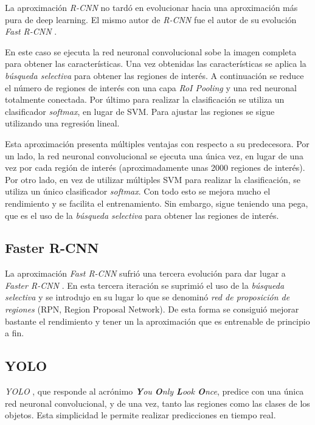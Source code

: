 La aproximación \textit{R-CNN} no tardó en evolucionar hacia una aproximación más pura de deep learning. El mismo autor de \textit{R-CNN} fue el autor de su evolución \textit{Fast R-CNN} \cite{s2_stateofart_fastrcnn}.

En este caso se ejecuta la red neuronal convolucional sobe la imagen completa para obtener las características. Una vez obtenidas las características se aplica la \textit{búsqueda selectiva} para obtener las regiones de interés. A continuación se reduce el número de regiones de interés con una capa \textit{RoI Pooling} y una red neuronal totalmente conectada. Por último para realizar la clasificación se utiliza un clasificador \textit{softmax}, en lugar de SVM. Para ajustar las regiones se sigue utilizando una regresión lineal.

Esta aproximación presenta múltiples ventajas con respecto a su predecesora. Por un lado, la red neuronal convolucional se ejecuta una única vez, en lugar de una vez por cada región de interés (aproximadamente unas 2000 regiones de interés). Por otro lado, en vez de utilizar múltiples SVM para realizar la clasificación, se utiliza un único clasificador \textit{softmax}. Con todo esto se mejora mucho el rendimiento y se facilita el entrenamiento. Sin embargo, sigue teniendo una pega, que es el uso de la \textit{búsqueda selectiva} para obtener las regiones de interés.

\subsection*{Faster R-CNN}

La aproximación \textit{Fast R-CNN} sufrió una tercera evolución para dar lugar a \textit{Faster R-CNN} \cite{s2_stateofart_fasterrcnn}. En esta tercera iteración se suprimió el uso de la \textit{búsqueda selectiva} y se introdujo en su lugar lo que se denominó \textit{red de proposición de regiones} (RPN, Region Proposal Network). De esta forma se consiguió mejorar bastante el rendimiento y tener un la aproximación que es entrenable de principio a fin.

\subsection*{YOLO}

\textit{YOLO} , que responde al acrónimo \textit{\textbf{Y}ou \textbf{O}nly \textbf{L}ook \textbf{O}nce}, predice con una única red neuronal convolucional, y de una vez, tanto las regiones como las clases de los objetos. Esta simplicidad le permite realizar predicciones en tiempo real.

